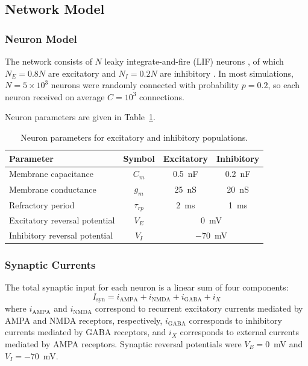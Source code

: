 \documentclass[12pt]{article}
\begin{document}
\subsection{Network Model}

\subsubsection{Neuron Model}

The network consists of $N$ leaky integrate-and-fire (LIF) neurons \citep{DayanAbbott2001}, of which $N_E = 0.8N$ are excitatory and $N_I = 0.2N$ are inhibitory \citep{Abeles1991, BraitenbergSchuz1998}. In most simulations, $N = 5 \times 10^3$ neurons were randomly connected with probability $p = 0.2$, so each neuron received on average $C = 10^3$ connections.

Neuron parameters are given in Table~\ref{tab:neuron_params}.

\begin{table}[htbp]
\centering
\caption{Neuron parameters for excitatory and inhibitory populations.}
\label{tab:neuron_params}
\begin{tabular}{lccc}
\toprule
\textbf{Parameter} & \textbf{Symbol} & \textbf{Excitatory} & \textbf{Inhibitory} \\
\midrule
Membrane capacitance & $C_m$ & 0.5~nF & 0.2~nF \\
Membrane conductance & $g_m$ & 25~nS & 20~nS \\
Refractory period & $\tau_{rp}$ & 2~ms & 1~ms \\
Excitatory reversal potential & $V_E$ & \multicolumn{2}{c}{0~mV} \\
Inhibitory reversal potential & $V_I$ & \multicolumn{2}{c}{$-70$~mV} \\
\bottomrule
\end{tabular}
\end{table}

\subsubsection{Synaptic Currents}

The total synaptic input for each neuron is a linear sum of four components:
\begin{equation}
I_{\text{syn}} = i_{\text{AMPA}} + i_{\text{NMDA}} + i_{\text{GABA}} + i_X
\end{equation}
where $i_{\text{AMPA}}$ and $i_{\text{NMDA}}$ correspond to recurrent excitatory currents mediated by AMPA and NMDA receptors, respectively, $i_{\text{GABA}}$ corresponds to inhibitory currents mediated by GABA receptors, and $i_X$ corresponds to external currents mediated by AMPA receptors. Synaptic reversal potentials were $V_E = 0$~mV and $V_I = -70$~mV.
\end{document}

